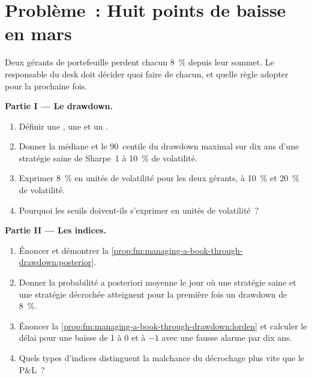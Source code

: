 \section{Problème~: Huit points de baisse en mars}

\begin{problem}\label{pb:fm:managing-a-book-through-drawdown:1}
Deux gérants de portefeuille perdent chacun 8~\% depuis leur sommet. Le responsable du desk doit décider quoi faire de chacun, et quelle règle adopter pour la prochaine fois.

\medskip\noindent\textbf{Partie I --- Le drawdown.}
\begin{enumerate}
\item Définir une , une  et un .
\item Donner la médiane et le 90~centile du drawdown maximal sur dix ans d'une stratégie saine de Sharpe~1 à 10~\% de volatilité.
\item Exprimer 8~\% en unités de volatilité pour les deux gérants, à 10~\% et 20~\% de volatilité.
\item Pourquoi les seuils doivent-ils s'exprimer en unités de volatilité~?
\end{enumerate}

\medskip\noindent\textbf{Partie II --- Les indices.}
\begin{enumerate}[resume]
\item Énoncer et démontrer la \cref{prop:fm:managing-a-book-through-drawdown:posterior}.
\item Donner la probabilité a posteriori moyenne le jour où une stratégie saine et une stratégie décrochée atteignent pour la première fois un drawdown de 8~\%.
\item Énoncer la \cref{prop:fm:managing-a-book-through-drawdown:lorden} et calculer le délai pour une baisse de 1 à 0 et à $-1$ avec une fausse alarme par
dix ans.
\item Quels types d'indices distinguent la malchance du décrochage plus vite que le P\&L~?
\end{enumerate}


\end{problem}
